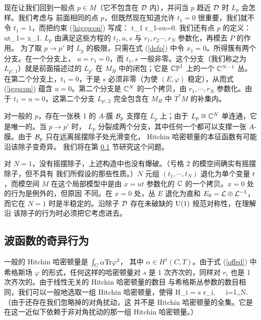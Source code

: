 现在让我们回到一般点 $p\in M$（它不包含在 ${\mathcal D}$ 内），并问当 $p$ 趋近 ${\mathcal D}$ 时 $L_p$ 会怎样。我们考虑与
前面相同的点 $p$，但既然现在知道允许 $t_1=0$ 很重要，我们就不令 $t_1=1$，而把约束 (\ref{higgscon}) 写成：
\be\label{iggscon} t_1 r_1-su=0. \ee
我们还有点 $p$ 的定义：
\be\label{defp} ut_1= x_1.\ee
$L_p $ 由满足这些方程的 $t_1,u,s$ 与 $r_1,r_2\cdots, r_N$ 参数化，再模去 $P$ 的作用。
为了取 $p\to p'$ 时 $L_p$ 的极限，只需在式 (\ref{defp}) 中令 $x_1=0$。所得簇有两个分支。在一个分支上，
$u=r_1=0$，而 $t_1,s$ 一般非零。这个分支（我们称之为 $L_{p',1}$）就是前面描述过的 $L_{p'}$ 在 $M_H$ 中的闭包；它是 ${\mathbb{CP}}^1$ 上的一个 ${\mathbb C}^{N-1}$ 丛。在第二个分支上，$t_1=0$，于是 $s$ 必须非零（为使 $(E,\varphi)$ 稳定），从而式
(\ref{iggscon}) 蕴含 $u=0$。第二个分支是 ${\mathbb C}^N$ 的一个拷贝，由 $r_1,\cdots, r_N$ 参数化。由于 $t_1=u=0$，这第二个分支 $L_{p',2}$
完全包含在 $M_H$ 中 $T^*M$ 的补集内。

对一般的 $p$，存在一张秩 1 的 $A$-膜 ${\mathcal B}_p$ 支撑在 $L_p$ 上；由于 $L_p \cong {\mathbb C}^N$ 单连通，它是唯一的。当 $p\to p'$ 时，
$L_p$ 分裂成两个分支，其中任何一个都可以支撑一张 $A$-膜。由于 ${\mathcal B}_p$ 只在远离摇摆除子处光滑变化，
Hitchin 哈密顿量的本征函数有可能沿该除子变奇异。
我们将在第 \ref{singular} 节研究这个问题。

对 $N=1$，没有摇摆除子，上述构造中也没有爆破。（亏格 2 的模空间确实有摇摆除子，但不具有
我们所假设的那些性质。）$N$ 元组 $(t_1,\cdots, t_N)$ 退化为单个变量
$t$，而模空间 $M$ 在这个局部模型中是由 $x=ut$ 参数化的 ${\mathbb C}$ 的一个拷贝。$x=0$ 处的行为是例外的，但原因
不同。在 $x=0$ 处，丛 $E$ 退化为直和 $E_0={\mathcal L}\oplus {\mathcal L}^{-1}$，而它在 $N=1$ 时是半稳定的。沿除子 ${\mathcal D}$ 存在未破缺的 ${\mathrm U}(1)$ 规范对称性，在理解沿
该除子的行为时必须把它考虑进去。

\subsection{波函数的奇异行为}\label{singular}





一般的 Hitchin 哈密顿量是 $\int_C \alpha {\rm Tr} \varphi^2$，
其中 $\alpha\in H^1(C,T)$。由于式 (\ref{offed}) 中希格斯场 $\varphi$ 的形式，任何这样的哈密顿量对 $s$ 是 1 次齐次的，同样对 $r_i$ 也是 1 次齐次的。由于线性无关的 Hitchin 哈密顿量的数目
与希格斯丛参数的数目相同，我们可以一般地选取一组 Hitchin 哈密顿量，使得
\be\label{genbas} H_i = s r_i,~~~i=1,\cdots,N.\ee（由于还存在我们忽略掉的对角扰动，这
并不是 Hitchin 哈密顿量的全集。它是在这一近似下依赖于非对角扰动的那一组 Hitchin 哈密顿量。）

